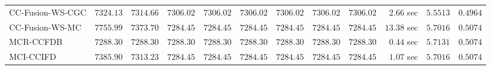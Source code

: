 \begin{table}[H]
\begin{tabular}{lrrrrrrrrrrr}
    CC-Fusion-WS-CGC & $      7324.13$ & $      7314.66$ & $      7306.02$ & $      7306.02$ & $      7306.02$ & $      7306.02$ & $      7306.02$ & $      7306.02$ & $         2.66$ sec    & $       5.5513$  & $       0.4964$ \\ 
     CC-Fusion-WS-MC & $      7755.99$ & $      7373.70$ & $      7284.45$ & $      7284.45$ & $      7284.45$ & $      7284.45$ & $      7284.45$ & $      7284.45$ & $        13.38$ sec    & $       5.7016$  & $       0.5074$ \\ 
\cmidrule{1-1} 
           MCR-CCFDB & $      7288.30$ & $      7288.30$ & $      7288.30$ & $      7288.30$ & $      7288.30$ & $      7288.30$ & $      7288.30$ & $      7288.30$ & $         0.44$ sec    & $       5.7131$  & $       0.5074$ \\ 
\cmidrule{1-1} 
           MCI-CCIFD & $      7385.90$ & $      7313.23$ & $      7284.45$ & $      7284.45$ & $      7284.45$ & $      7284.45$ & $      7284.45$ & $      7284.45$ & $         1.07$ sec    & $       5.7016$  & $       0.5074$ \\ 
\bottomrule
\end{tabular}
\end{table}

